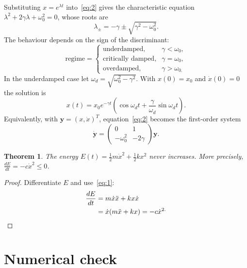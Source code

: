 \documentclass[11pt,a4paper]{article}
\newtheorem{theorem}{Theorem}
\begin{document}
Substituting $x=e^{\lambda t}$ into~\eqref{eq:2} gives the characteristic equation $\lambda^{2}+2\gamma\lambda+\omega_{0}^{2}=0$, whose roots are
\begin{equation}
  \lambda_{\pm}=-\gamma\pm\sqrt{\gamma^{2}-\omega_{0}^{2}}.
\end{equation}
The behaviour depends on the sign of the discriminant:
\begin{equation*}
  \text{regime}=\begin{cases}
\text{underdamped}, & \gamma<\omega_{0}, \\
\text{critically damped}, & \gamma=\omega_{0}, \\
\text{overdamped}, & \gamma>\omega_{0.}
\end{cases}
\end{equation*}
In the underdamped case let $\omega_{d}=\sqrt{\omega_{0}^{2}-\gamma^{2}}$. With $x(0)=x_{0}$ and $\dot{x}(0)=0$ the solution is
\begin{equation}
  x(t)=x_{0}e^{-\gamma t}\left( \cos\omega_{d}t+\frac{\gamma}{\omega_{d}}\sin\omega_{d}t \right).
  \label{eq:cos-dsin}
\end{equation}
Equivalently, with $\mathbf{y}=(x,\dot{x})^{T}$, equation~\eqref{eq:2} becomes the first-order system
\begin{equation}
  \dot{\mathbf{y}}=\begin{pmatrix}
0 & 1 \\
-\omega_{0}^{2} & -2\gamma
\end{pmatrix}\mathbf{y}.
\end{equation}

\begin{theorem}
  The energy $E(t)=\frac{1}{2}m\dot{x}^{2}+\frac{1}{2}kx^{2}$ never increases. More precisely, $\frac{dE}{dt}=-c\dot{x}^{2}\leq0$.
\end{theorem}

\begin{proof}
  Differentiate $E$ and use~\eqref{eq:1}:
\begin{align*}
  \frac{dE}{dt} &=m\dot{x}\ddot{x}+kx\dot{x} \\
   &=\dot{x}(m\ddot{x}+kx)=-c\dot{x}^{2.} \qedhere
\end{align*}
\end{proof}

\section{Numerical check}\label{sec:results}
\end{document}
